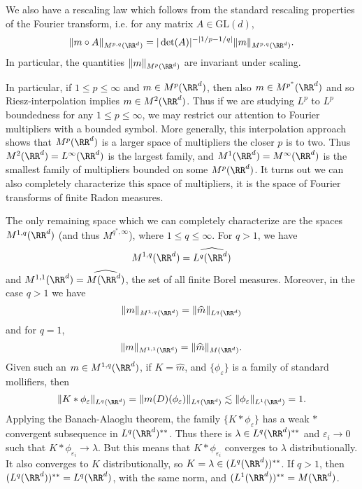 We also have a rescaling law which follows from the standard rescaling properties of the Fourier transform, i.e. for any matrix $A \in \text{GL}(d)$,
%
\[ \| m \circ A \|_{M^{p,q}(\RR^d)} = |\det(A)|^{-|1/p - 1/q|} \| m \|_{M^{p,q}(\RR^d)}. \]
%
In particular, the quantities $\| m \|_{M^p(\RR^d)}$ are invariant under scaling.

In particular, if $1 \leq p \leq \infty$ and $m \in M^p(\RR^d)$, then also $m \in M^{p^*}(\RR^d)$ and so Riesz-interpolation implies $m \in M^{2}(\RR^d)$. Thus if we are studying $L^p$ to $L^p$ boundedness for any $1 \leq p \leq \infty$, we may restrict our attention to Fourier multipliers with a bounded symbol. More generally, this interpolation approach shows that $M^p(\RR^d)$ is a larger space of multipliers the closer $p$ is to two. Thus $M^2(\RR^d) = L^\infty(\RR^d)$ is the largest family, and $M^1(\RR^d) = M^\infty(\RR^d)$ is the smallest family of multipliers bounded on some $M^p(\RR^d)$. It turns out we can also completely characterize this space of multipliers, it is the space of Fourier transforms of finite Radon measures.

\begin{example}
    The only remaining space which we can completely characterize are the spaces $M^{1,q}(\RR^d)$ (and thus $M^{q^*,\infty}$), where $1 \leq q \leq \infty$. For $q > 1$, we have
    \[ M^{1,q}(\RR^d) = \widehat{L^q(\RR^d)} \]
    and $M^{1,1}(\RR^d) = \widehat{M(\RR^d)}$, the set of all finite Borel measures. Moreover, in the case $q > 1$ we have
    \[ \| m \|_{M^{1,q}(\RR^d)} = \| \widehat{m} \|_{L^q(\RR^d)} \]
    and for $q = 1$,
    \[ \| m \|_{M^{1,1}(\RR^d)} = \| \widehat{m} \|_{M(\RR^d)}. \]
    Given such an $m \in M^{1,q}(\RR^d)$, if $K = \widehat{m}$, and $\{ \phi_\varepsilon \}$ is a family of standard mollifiers, then
    \[ \| K * \phi_\varepsilon \|_{L^q(\RR^d)} = \| m(D)(\phi_\varepsilon) \|_{L^q(\RR^d)} \lesssim \| \phi_\varepsilon \|_{L^1(\RR^d)} = 1. \]
    Applying the Banach-Alaoglu theorem, the family $\{ K * \phi_\varepsilon \}$ has a weak $*$ convergent subsequence in $L^q(\RR^d)^{**}$. Thus there is $\lambda \in L^q(\RR^d)^{**}$ and $\varepsilon_i \to 0$ such that $K * \phi_{\varepsilon_i} \to \lambda$. But this means that $K * \phi_{\varepsilon_i}$ converges to $\lambda$ distributionally. It also converges to $K$ distributionally, so $K = \lambda \in (L^q(\RR^d))^{**}$. If $q > 1$, then $(L^q(\RR^d))^{**} = L^q(\RR^d)$, with the same norm, and $(L^1(\RR^d))^{**} = M(\RR^d)$.
\end{example}

